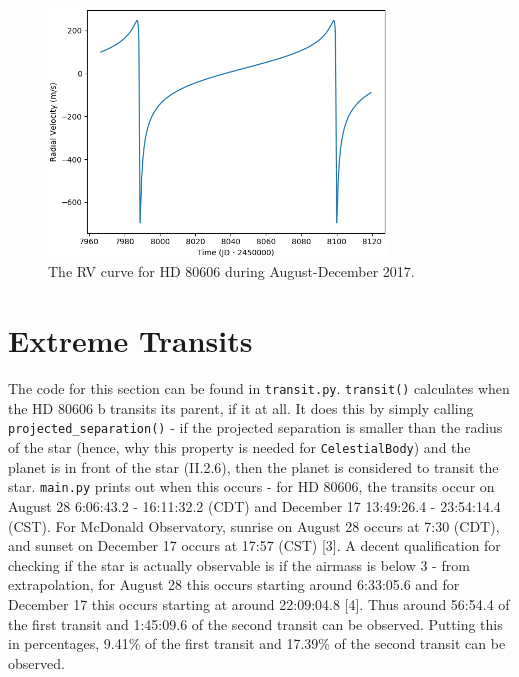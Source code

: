 \documentclass[12pt]{article}
\begin{document}
\begin{figure}[H]
\centering
\vspace{1em}
\includegraphics[width=0.8\textwidth]{rv.png}
\vspace{-1em}
\caption{The RV curve for HD 80606 during August-December 2017.}
\end{figure}


\section{Extreme Transits}
The code for this section can be found in \texttt{transit.py}. \texttt{transit()} calculates when the HD 80606 b transits its parent, if it at all. It does this by simply calling \texttt{projected\_separation()} - if the projected separation is smaller than the radius of the star (hence, why this property is needed for \texttt{CelestialBody}) and the planet is in front of the star (II.2.6), then the planet is considered to transit the star. \texttt{main.py} prints out when this occurs - for HD 80606, the transits occur on August 28 6:06:43.2 - 16:11:32.2 (CDT) and December 17 13:49:26.4 - 23:54:14.4 (CST). For McDonald Observatory, sunrise on August 28 occurs at 7:30 (CDT), and sunset on December 17 occurs at 17:57 (CST) [3]. A decent qualification for checking if the star is actually observable is if the airmass is below 3 - from extrapolation, for August 28 this occurs starting around 6:33:05.6 and for December 17 this occurs starting at around 22:09:04.8 [4]. Thus around 56:54.4 of the first transit and 1:45:09.6 of the second transit can be observed. Putting this in percentages, 9.41\% of the first transit and 17.39\% of the second transit can be observed.
\end{document}
